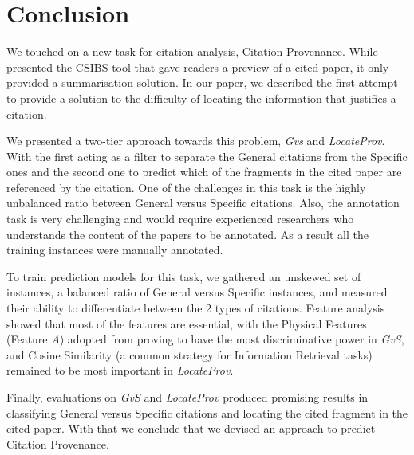 \chapter{Conclusion}
\label{conclusion}
We touched on a new task for citation analysis, Citation Provenance. While  presented the CSIBS tool that gave readers a preview of a cited paper, it only provided a summarisation solution. In our paper, we described the first attempt to provide a solution to the difficulty of locating the information that justifies a citation.

We presented a two-tier approach towards this problem, {\it Gvs} and {\it LocateProv}. With the first acting as a filter to separate the General citations from the Specific ones and the second one to predict which of the fragments in the cited paper are referenced by the citation. One of the challenges in this task is the highly unbalanced ratio between General versus Specific citations. Also, the annotation task is very challenging and would require experienced researchers who understands the content of the papers to be annotated. As a result all the training instances were manually annotated.

To train prediction models for this task, we gathered an unskewed set of instances, a balanced ratio of General versus Specific instances, and measured their ability to differentiate between the 2 types of citations. Feature analysis showed that most of the features are essential, with the Physical Features (Feature $A$) adopted from  proving to have the most discriminative power in {\it GvS}, and Cosine Similarity (a common strategy for Information Retrieval tasks) remained to be most important in {\it LocateProv}.

Finally, evaluations on {\it GvS} and {\it LocateProv} produced promising results in classifying General versus Specific citations and locating the cited fragment in the cited paper. With that we conclude that we devised an approach to predict Citation Provenance.